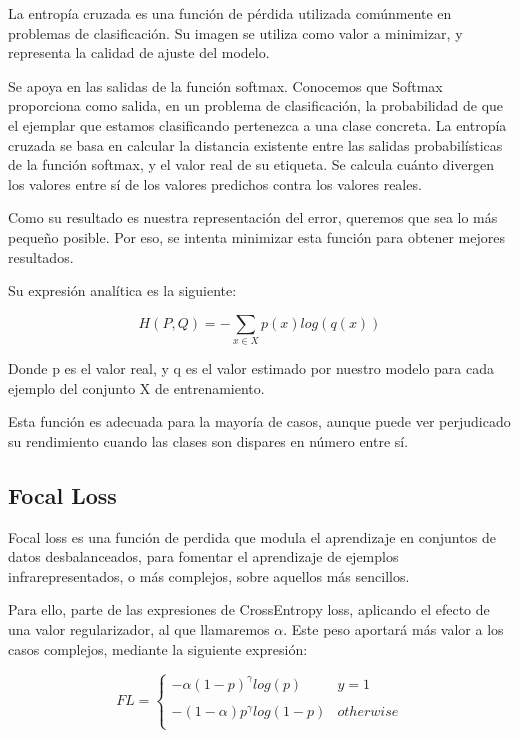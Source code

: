 La entropía cruzada es una función de pérdida utilizada comúnmente en problemas de clasificación. Su imagen se utiliza como valor a minimizar, y representa la calidad de ajuste del modelo.

Se apoya en las salidas de la función softmax. Conocemos que Softmax proporciona como salida, en un problema de clasificación, la probabilidad de que el ejemplar que estamos clasificando pertenezca a una clase concreta. La entropía cruzada se basa en calcular la distancia existente entre las salidas probabilísticas de la función softmax, y el valor real de su etiqueta. Se calcula cuánto divergen los valores entre sí de los valores predichos contra los valores reales.

Como su resultado es nuestra representación del error, queremos que sea lo más pequeño posible. Por eso, se intenta minimizar esta función para obtener mejores resultados.

Su expresión analítica es la siguiente:

$$H(P,Q)= -\sum_{x \in X}p(x)log(q(x))$$

Donde p es el valor real, y q es el valor estimado por nuestro modelo para cada ejemplo del conjunto X de entrenamiento.

Esta función es adecuada para la mayoría de casos, aunque puede ver perjudicado su rendimiento cuando las clases son dispares en número entre sí.

\subsection{Focal Loss}

Focal loss \cite{lin2018focal} es una función de perdida que modula el aprendizaje en conjuntos de datos desbalanceados, para fomentar el aprendizaje de ejemplos infrarepresentados, o más complejos, sobre aquellos más sencillos.

Para ello, parte de las expresiones de CrossEntropy loss, aplicando el efecto de una valor regularizador, al que llamaremos $\alpha$. Este peso aportará más valor a los casos complejos, mediante la siguiente expresión:

$$FL = \left\{ \begin{array}{lcc} -\alpha(1-p)^{\gamma}log(p)& y = 1 \\ 
	\\  -(1-\alpha)p^{\gamma}log(1-p) & otherwise  \\ \end{array} \right.$$

